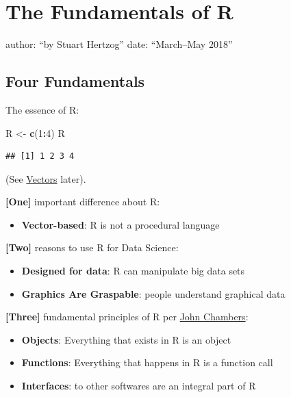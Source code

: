 \documentclass[]{book}
\newenvironment{Shaded}{\begin{snugshade}}{\end{snugshade}}
\newcommand{\DecValTok}[1]{\textcolor[rgb]{0.00,0.00,0.81}{#1}}
\newcommand{\KeywordTok}[1]{\textcolor[rgb]{0.13,0.29,0.53}{\textbf{#1}}}
\newcommand{\NormalTok}[1]{#1}
\newcommand{\OperatorTok}[1]{\textcolor[rgb]{0.81,0.36,0.00}{\textbf{#1}}}
\newcommand{\StringTok}[1]{\textcolor[rgb]{0.31,0.60,0.02}{#1}}
\providecommand{\tightlist}{%
  \setlength{\itemsep}{0pt}\setlength{\parskip}{0pt}}
\theoremstyle{definition}
\theoremstyle{definition}
\theoremstyle{definition}
\theoremstyle{remark}
\begin{document}
\hypertarget{the-fundamentals-of-r}{%
\chapter{The Fundamentals of R}\label{the-fundamentals-of-r}}

author: ``by Stuart Hertzog'' date: ``March--May 2018''

\hypertarget{four-fundamentals}{%
\section{Four Fundamentals}\label{four-fundamentals}}

The essence of R:

\begin{Shaded}
\begin{Highlighting}[]
\NormalTok{R <-}\StringTok{ }\KeywordTok{c}\NormalTok{(}\DecValTok{1}\OperatorTok{:}\DecValTok{4}\NormalTok{)}
\NormalTok{R}
\end{Highlighting}
\end{Shaded}

\begin{verbatim}
## [1] 1 2 3 4
\end{verbatim}

(See \protect\hyperlink{vectors}{Vectors} later).

\textbf{{[}One{]}} important difference about R:

\begin{itemize}
\tightlist
\item
  \textbf{Vector-based}: R is not a procedural language
\end{itemize}

\textbf{{[}Two{]}} reasons to use R for Data Science:

\begin{itemize}
\tightlist
\item
  \textbf{Designed for data}: R can manipulate big data sets
\item
  \textbf{Graphics Are Graspable}: people understand graphical data
\end{itemize}

\textbf{{[}Three{]}} fundamental principles of R per
\href{https://en.wikipedia.org/wiki/John_Chambers_(statistician)}{John
Chambers}:

\begin{itemize}
\tightlist
\item
  \textbf{Objects}: Everything that exists in R is an object
\item
  \textbf{Functions}: Everything that happens in R is a function call
\item
  \textbf{Interfaces}: to other softwares are an integral part of R
\end{itemize}
\end{document}
